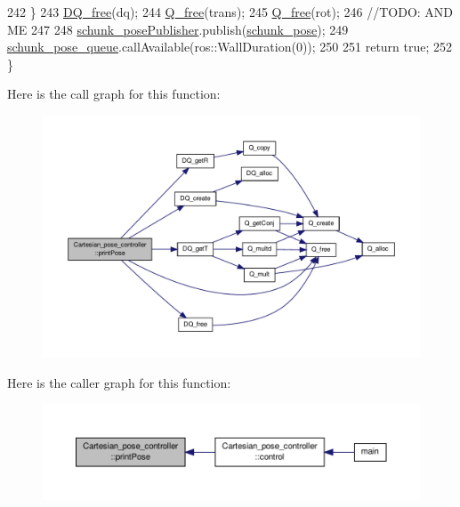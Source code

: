 \begin{DoxyCode}
242         \}
243         \hyperlink{dualquaternion_8h_a1d21b6cb665c04de4be5aca50804caf4}{DQ\_free}(dq);
244         \hyperlink{quaternion_8h_a69ecc76f665022f81be1702c20865de4}{Q\_free}(trans);
245         \hyperlink{quaternion_8h_a69ecc76f665022f81be1702c20865de4}{Q\_free}(rot);
246         \textcolor{comment}{//TODO: AND ME}
247 
248         \hyperlink{classCartesian__pose__controller_a9eb38e771e5006950b9a8075a0ea7e49}{schunk\_posePublisher}.publish(\hyperlink{classCartesian__pose__controller_a301bc44e901e4837cf036661478354c4}{schunk\_pose});
249         \hyperlink{classCartesian__pose__controller_a5efe52a57e5239b3fd86ff456e94691b}{schunk\_pose\_queue}.callAvailable(ros::WallDuration(0));
250 
251         \textcolor{keywordflow}{return} \textcolor{keyword}{true};
252 \}
\end{DoxyCode}


Here is the call graph for this function\-:\nopagebreak
\begin{figure}[H]
\begin{center}
\leavevmode
\includegraphics[width=350pt]{classCartesian__pose__controller_ab55ab40074c82ba8cc010fe68fc76d5b_cgraph}
\end{center}
\end{figure}




Here is the caller graph for this function\-:\nopagebreak
\begin{figure}[H]
\begin{center}
\leavevmode
\includegraphics[width=350pt]{classCartesian__pose__controller_ab55ab40074c82ba8cc010fe68fc76d5b_icgraph}
\end{center}
\end{figure}


